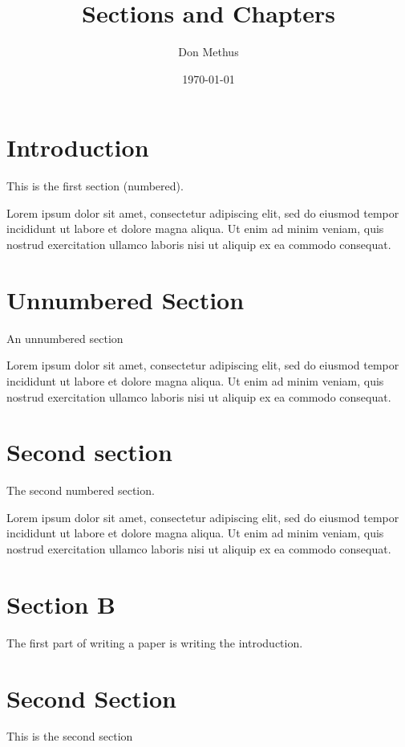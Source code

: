 \documentclass{article}
\title{Sections and Chapters}
\author{Don Methus}
\date{\today}
\begin{document}
	\maketitle
	\tableofcontents
	
	\newcommand\shortlorem{Lorem ipsum dolor sit amet, consectetur adipiscing elit, sed do eiusmod tempor incididunt ut labore et dolore magna aliqua. Ut enim ad minim veniam, quis nostrud exercitation ullamco laboris nisi ut aliquip ex ea commodo consequat.}
	
	\section{Introduction}
	This is the first section (numbered).
	
	\shortlorem
	\section{Unnumbered Section}
	An unnumbered section
	
	\shortlorem
	
	\section{Second section}
	The second numbered section.
	
	\shortlorem
	\section{Section B}
	The first part of writing a paper is writing the introduction.
	\blindtext
	
	\section{Second Section}
	This is the second section
	
	\blindtext
	
\end{document}
